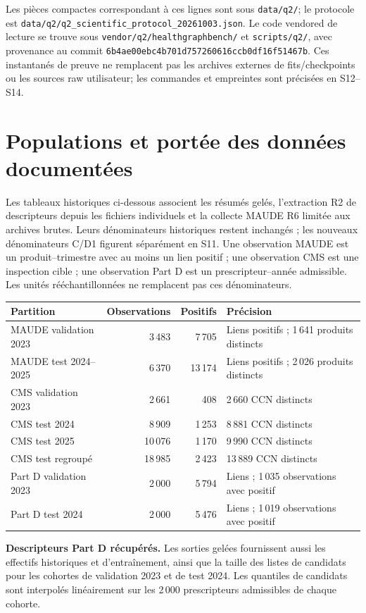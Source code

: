 \documentclass[10pt,a4paper]{article}
\newcommand{\src}[1]{{\small\nolinkurl{#1}}}
\begin{document}
Les pièces compactes correspondant à ces lignes sont sous \src{data/q2/}; le protocole est \src{data/q2/q2_scientific_protocol_20261003.json}. Le code vendored de lecture se trouve sous \src{vendor/q2/healthgraphbench/} et \src{scripts/q2/}, avec provenance au commit \src{6b4ae00ebc4b701d757260616ccb0df16f51467b}. Ces instantanés de preuve ne remplacent pas les archives externes de fits/checkpoints ou les sources raw utilisateur; les commandes et empreintes sont précisées en S12--S14.



\section{Populations et portée des données documentées}
\label{supp:population}
Les tableaux historiques ci-dessous associent les résumés gelés, l'extraction R2 de descripteurs depuis les fichiers individuels et la collecte MAUDE R6 limitée aux archives brutes. Leurs dénominateurs historiques restent inchangés ; les nouveaux dénominateurs C/D1 figurent séparément en S11. Une observation MAUDE est un produit--trimestre avec au moins un lien positif ; une observation CMS est une inspection cible ; une observation Part D est un prescripteur--année admissible. Les unités rééchantillonnées ne remplacent pas ces dénominateurs.

\begin{tabularx}{\linewidth}{@{}p{35mm}rrX@{}}
\toprule
Partition & Observations & Positifs & Précision\\
\midrule
MAUDE validation 2023 & 3\,483 & 7\,705 & Liens positifs ; 1\,641 produits distincts\\
MAUDE test 2024--2025 & 6\,370 & 13\,174 & Liens positifs ; 2\,026 produits distincts\\
CMS validation 2023 & 2\,661 & 408 & 2\,660 CCN distincts\\
CMS test 2024 & 8\,909 & 1\,253 & 8\,881 CCN distincts\\
CMS test 2025 & 10\,076 & 1\,170 & 9\,990 CCN distincts\\
CMS test regroupé & 18\,985 & 2\,423 & 13\,889 CCN distincts\\
Part D validation 2023 & 2\,000 & 5\,794 & Liens ; 1\,035 observations avec positif\\
Part D test 2024 & 2\,000 & 5\,476 & Liens ; 1\,019 observations avec positif\\
\bottomrule
\end{tabularx}
\textbf{Descripteurs Part D récupérés.} Les sorties gelées fournissent aussi les effectifs historiques et d'entraînement, ainsi que la taille des listes de candidats pour les cohortes de validation 2023 et de test 2024. Les quantiles de candidats sont interpolés linéairement sur les 2\,000 prescripteurs admissibles de chaque cohorte.
\end{document}
